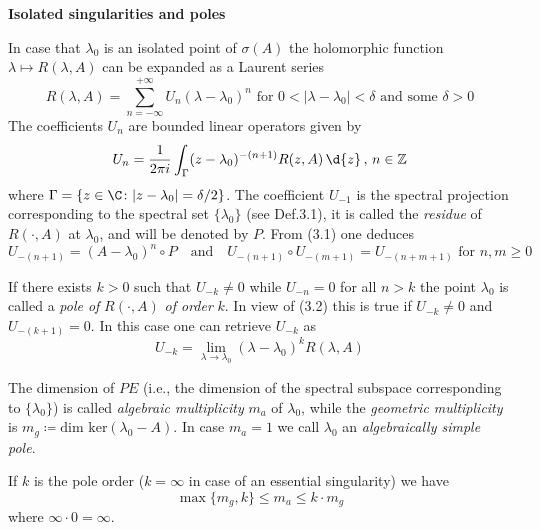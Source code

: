 \begin{example}{\textbf{Isolated singularities and poles}}\label{ex:a3-3.6}

In case that $\lambda_{0}$ is an isolated point of $\sigma(A)$ the holomorphic function $\lambda \mapsto R(\lambda,A)$ can be expanded as a Laurent series
\[
R(\lambda,A) = \sum_{n=-\infty}^{+\infty} U_{n}(\lambda - \lambda_{0})^{n} \text{ for } 0 < |\lambda - \lambda_{0}| < \delta \text{ and some } \delta > 0
\]
The coefficients $U_{n}$ are bounded linear operators given by
\begin{equation}\label{eq:a3-3.1}
U_{n} = \frac{1}{2\pi i}\int_{\Gamma} (z - \lambda_{0})^{-(n+1)}R(z,A) \, \d{z} \, , \, n \in \mathbb{Z}
\end{equation}
where $\Gamma = \{z \in \C \colon |z - \lambda_{0}| = \delta/2\}$.
The coefficient $U_{-1}$ is the spectral projection corresponding to the spectral set $\{\lambda_{0}\}$ (see Def.3.1), it is called the \emph{residue} of $R(\cdot,A)$ at $\lambda_{0}$, and will be denoted by $P$.
From (3.1) one deduces
\begin{equation}\label{eq:a3-3.2}
U_{-(n+1)} = (A - \lambda_{0})^{n} \circ P \quad \text{and} \quad U_{-(n+1)} \circ U_{-(m+1)} = U_{-(n+m+1)} \text{ for } n, m \geq 0
\end{equation}


If there exists $k > 0$ such that $U_{-k} \neq 0$ while $U_{-n} = 0$ for all $n > k$ the point $\lambda_{0}$ is called a \emph{pole of} $R(\cdot,A)$ \emph{of order} $k$.
In view of (3.2) this is true if $U_{-k} \neq 0$ and $U_{-(k+1)} = 0$.
In this case one can retrieve $U_{-k}$ as
\begin{equation}\label{eq:a3-3.3}
U_{-k} = \lim_{\lambda \to \lambda_{0}} (\lambda - \lambda_{0})^{k}R(\lambda,A)
\end{equation}

The dimension of $PE$ (i.e., the dimension of the spectral subspace corresponding to $\{\lambda_{0}\}$) is called \emph{algebraic multiplicity} $m_{a}$ of $\lambda_{0}$, while the \emph{geometric multiplicity} is $m_{g} \coloneqq \text{dim ker}(\lambda_{0} - A)$.
In case $m_{a} = 1$ we call $\lambda_{0}$ an \emph{algebraically simple pole}.

If $k$ is the pole order ($k = \infty$ in case of an essential singularity) we have
\begin{equation}\label{eq:a3-3.4}
\max\{m_{g},k\} \leq m_{a} \leq k \cdot m_{g}
\end{equation}
where $\infty \cdot 0 = \infty$.


\end{example}
